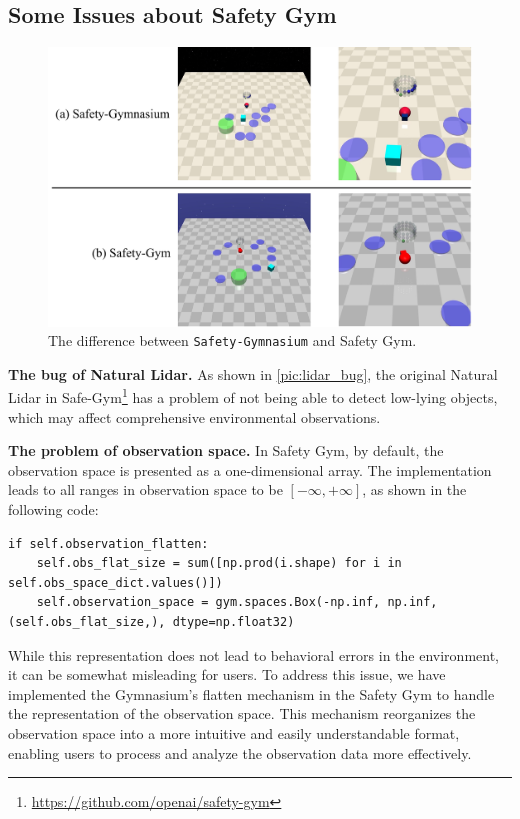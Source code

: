 \documentclass{article}
\begin{document}
\subsection{Some Issues about Safety Gym}
\begin{figure}[H]
  \centering
  \includegraphics[width=\linewidth]{assets/appendix/lidar_bug.pdf}
  \caption{The difference between \texttt{Safety-Gymnasium} and Safety Gym.}
  \label{pic:lidar_bug}
\end{figure}
\textbf{The bug of Natural Lidar.} As shown in \autoref{pic:lidar_bug}, the original Natural Lidar in Safe-Gym\footnote{\url{https://github.com/openai/safety-gym}} has a problem of not being able to detect low-lying objects, which may affect comprehensive environmental observations.

\textbf{The problem of observation space.} In Safety Gym, by default, the observation space is presented as a one-dimensional array. The implementation leads to all ranges in observation space to be $[-\infty, +\infty]$, as shown in the following code:

\begin{lstlisting}
if self.observation_flatten:
    self.obs_flat_size = sum([np.prod(i.shape) for i in self.obs_space_dict.values()])
    self.observation_space = gym.spaces.Box(-np.inf, np.inf, (self.obs_flat_size,), dtype=np.float32)
\end{lstlisting}

While this representation does not lead to behavioral errors in the environment, it can be somewhat misleading for users. To address this issue, we have implemented the Gymnasium's flatten mechanism in the Safety Gym to handle the representation of the observation space. This mechanism reorganizes the observation space into a more intuitive and easily understandable format, enabling users to process and analyze the observation data more effectively.
\end{document}
